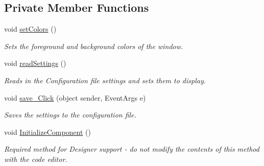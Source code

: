\subsection*{Private Member Functions}
\begin{DoxyCompactItemize}
\item 
void \mbox{\hyperlink{class_cert_complete_1_1_p_a_x___settings___form_af4ee75bf22541ea6764e0c013ebaad31}{set\+Colors}} ()
\begin{DoxyCompactList}\small\item\em Sets the foreground and background colors of the window. \end{DoxyCompactList}\item 
void \mbox{\hyperlink{class_cert_complete_1_1_p_a_x___settings___form_a13ed9a20e6d8dec0795b49691808049d}{read\+Settings}} ()
\begin{DoxyCompactList}\small\item\em Reads in the Configuration file settings and sets them to display. \end{DoxyCompactList}\item 
void \mbox{\hyperlink{class_cert_complete_1_1_p_a_x___settings___form_aeed32497d39dc56aeb2f2aa85b50cdf6}{save\+\_\+\+Click}} (object sender, Event\+Args e)
\begin{DoxyCompactList}\small\item\em Saves the settings to the configuration file. \end{DoxyCompactList}\item 
void \mbox{\hyperlink{class_cert_complete_1_1_p_a_x___settings___form_a8538b7863ee67d410abf47324aa6b9ae}{Initialize\+Component}} ()
\begin{DoxyCompactList}\small\item\em Required method for Designer support -\/ do not modify the contents of this method with the code editor. \end{DoxyCompactList}\end{DoxyCompactItemize}
